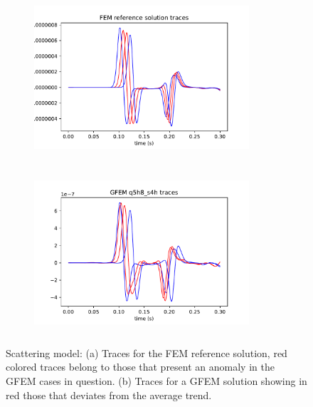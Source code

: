  \begin{figure}[h!]
 		\centering
		\begin{subfigure}{8cm}
				\includegraphics[width=8cm, height=6cm]{Thesis_Edith/figures/scattering/appendix/fem_scat_traces.pdf}
			     \caption{}
		\end{subfigure}
        \hspace{0.25cm}
		\begin{subfigure}{8cm}
				\includegraphics[width=8cm, height=6cm]{Thesis_Edith/figures/scattering/appendix/gfem_scat_traces.pdf}
			   \caption{}
		\end{subfigure}
 
	\caption{Scattering model: (a) Traces for the FEM reference solution, red colored traces belong to those that present an anomaly in the GFEM cases in question. (b) Traces for a GFEM solution showing in red those that deviates from the average trend.}  
	\label{fig:a.1}
\end{figure}

